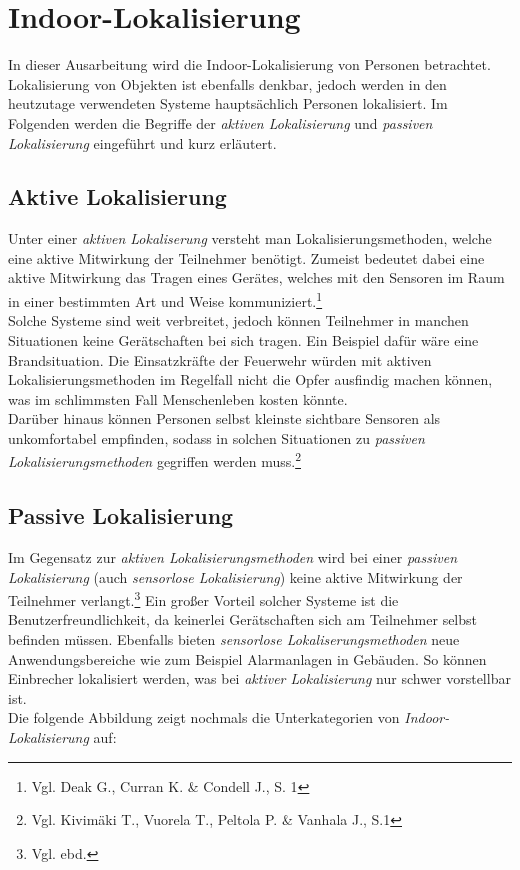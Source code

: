 \section{Indoor-Lokalisierung}

In dieser Ausarbeitung wird die Indoor-Lokalisierung von Personen betrachtet. Lokalisierung von Objekten ist ebenfalls denkbar, jedoch werden in den heutzutage verwendeten Systeme hauptsächlich Personen lokalisiert. Im Folgenden werden die Begriffe der \textit{aktiven Lokalisierung} und \textit{passiven Lokalisierung} eingeführt und kurz erläutert.

\subsection{Aktive Lokalisierung}
Unter einer \textit{aktiven Lokaliserung} versteht man Lokalisierungsmethoden, welche eine aktive Mitwirkung der Teilnehmer benötigt. Zumeist bedeutet dabei eine aktive Mitwirkung das Tragen eines Gerätes, welches mit den Sensoren im Raum in einer bestimmten Art und Weise kommuniziert.\footnote{Vgl. Deak G.,  Curran K. \& Condell J., S. 1}\\
Solche Systeme sind weit verbreitet, jedoch können Teilnehmer in manchen Situationen keine Gerätschaften bei sich tragen. Ein Beispiel dafür wäre eine Brandsituation. Die Einsatzkräfte der Feuerwehr würden mit aktiven Lokalisierungsmethoden im Regelfall nicht die Opfer ausfindig machen können, was im schlimmsten Fall Menschenleben kosten könnte.\\
Darüber hinaus können Personen selbst kleinste sichtbare Sensoren als unkomfortabel empfinden, sodass in solchen Situationen zu \textit{passiven Lokalisierungsmethoden} gegriffen werden muss.\footnote{Vgl. Kivimäki T., Vuorela T., Peltola P. \& Vanhala J., S.1}
\subsection{Passive Lokalisierung}
Im Gegensatz zur \textit{aktiven Lokalisierungsmethoden} wird bei einer \textit{passiven Lokalisierung} (auch \textit{sensorlose Lokalisierung}) keine aktive Mitwirkung der Teilnehmer verlangt.\footnote{Vgl. ebd.} Ein großer Vorteil solcher Systeme ist die Benutzerfreundlichkeit, da keinerlei Gerätschaften sich am Teilnehmer selbst befinden müssen. Ebenfalls bieten \textit{sensorlose Lokaliserungsmethoden} neue Anwendungsbereiche wie zum Beispiel Alarmanlagen in Gebäuden. So können Einbrecher lokalisiert werden, was bei \textit{aktiver Lokalisierung} nur schwer vorstellbar ist.\\
Die folgende Abbildung zeigt nochmals die Unterkategorien von \textit{Indoor-Lokalisierung} auf:

